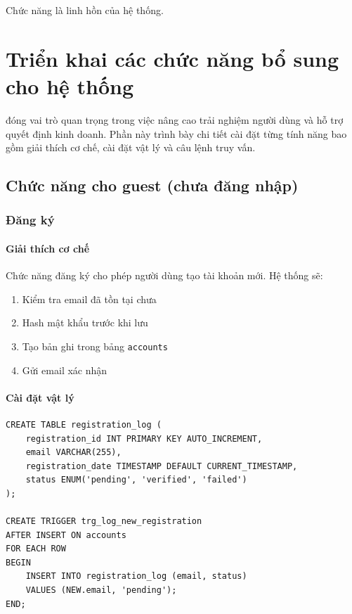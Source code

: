 \begin{savequote}[75mm]
Chức năng là linh hồn của hệ thống.
\end{savequote}

\chapter{Triển khai các chức năng bổ sung cho hệ thống}

 đóng vai trò quan trọng trong việc nâng cao trải nghiệm người dùng và hỗ trợ quyết định kinh doanh. Phần này trình bày chi tiết cài đặt từng tính năng bao gồm giải thích cơ chế, cài đặt vật lý và câu lệnh truy vấn.

\section{Chức năng cho guest (chưa đăng nhập)}

\subsection{Đăng ký}

\subsubsection{Giải thích cơ chế}

Chức năng đăng ký cho phép người dùng tạo tài khoản mới. Hệ thống sẽ:
\begin{enumerate}
    \item Kiểm tra email đã tồn tại chưa
    \item Hash mật khẩu trước khi lưu
    \item Tạo bản ghi trong bảng \texttt{accounts}
    \item Gửi email xác nhận
\end{enumerate}

\subsubsection{Cài đặt vật lý}

\begin{verbatim}
CREATE TABLE registration_log (
    registration_id INT PRIMARY KEY AUTO_INCREMENT,
    email VARCHAR(255),
    registration_date TIMESTAMP DEFAULT CURRENT_TIMESTAMP,
    status ENUM('pending', 'verified', 'failed')
);

CREATE TRIGGER trg_log_new_registration
AFTER INSERT ON accounts
FOR EACH ROW
BEGIN
    INSERT INTO registration_log (email, status)
    VALUES (NEW.email, 'pending');
END;
\end{verbatim}

